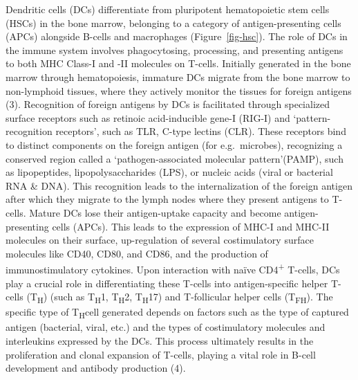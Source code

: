 \documentclass[
]{article}
\begin{document}
Dendritic cells (DCs) differentiate from pluripotent hematopoietic stem
cells (HSCs) in the bone marrow, belonging to a category of
antigen-presenting cells (APCs) alongside B-cells and macrophages
(Figure~\ref{fig-hsc}). The role of DCs in the immune system involves
phagocytosing, processing, and presenting antigens to both MHC Class-I
and -II molecules on T-cells. Initially generated in the bone marrow
through hematopoiesis, immature DCs migrate from the bone marrow to
non-lymphoid tissues, where they actively monitor the tissues for
foreign antigens (3). Recognition of foreign antigens by DCs is
facilitated through specialized surface receptors such as retinoic
acid-inducible gene-I (RIG-I) and `pattern-recognition receptors', such
as TLR, C-type lectins (CLR). These receptors bind to distinct
components on the foreign antigen (for e.g.~microbes), recognizing a
conserved region called a `pathogen-associated molecular pattern'(PAMP),
such as lipopeptides, lipopolysaccharides (LPS), or nucleic acids (viral
or bacterial RNA \& DNA). This recognition leads to the internalization
of the foreign antigen after which they migrate to the lymph nodes where
they present antigens to T-cells. Mature DCs lose their antigen-uptake
capacity and become antigen-presenting cells (APCs). This leads to the
expression of MHC-I and MHC-II molecules on their surface, up-regulation
of several costimulatory surface molecules like CD40, CD80, and CD86,
and the production of immunostimulatory cytokines. Upon interaction with
naïve CD4\textsuperscript{+} T-cells, DCs play a crucial role in
differentiating these T-cells into antigen-specific helper T-cells
(T\textsubscript{H}) (such as T\textsubscript{H}1, T\textsubscript{H}2,
T\textsubscript{H}17) and T-follicular helper cells
(T\textsubscript{FH}). The specific type of T\textsubscript{H}cell
generated depends on factors such as the type of captured antigen
(bacterial, viral, etc.) and the types of costimulatory molecules and
interleukins expressed by the DCs. This process ultimately results in
the proliferation and clonal expansion of T-cells, playing a vital role
in B-cell development and antibody production (4).
\end{document}
